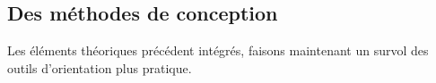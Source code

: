 
\subsection{Des méthodes de conception}
\label{meth_conception}
Les éléments théoriques précédent intégrés, faisons maintenant un survol des outils d'orientation plus pratique.



%
%





